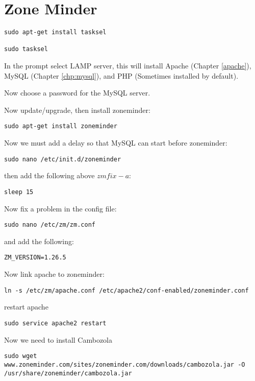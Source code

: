 \chapter{Zone Minder}
\label{chp:zm}

\begin{lstlisting}
sudo apt-get install tasksel

sudo tasksel
\end{lstlisting}

In the prompt select LAMP server, this will install Apache (Chapter \ref{apache}), MySQL (Chapter \ref{chp:mysql}), and PHP (Sometimes installed by default).

Now choose a password for the MySQL server.

Now update/upgrade, then install zoneminder:

\begin{lstlisting}
sudo apt-get install zoneminder
\end{lstlisting}

Now we must add a delay so that MySQL can start before zoneminder:

\begin{lstlisting}
sudo nano /etc/init.d/zoneminder
\end{lstlisting}

then add the following above $zmfix -a$:

\begin{verbatim}
sleep 15
\end{verbatim}

Now fix a problem in the config file:

\begin{lstlisting}
sudo nano /etc/zm/zm.conf
\end{lstlisting}

and add the following:

\begin{verbatim}
ZM_VERSION=1.26.5
\end{verbatim}

Now link apache to zoneminder:

\begin{lstlisting}
ln -s /etc/zm/apache.conf /etc/apache2/conf-enabled/zoneminder.conf
\end{lstlisting}

restart apache

\begin{lstlisting}
sudo service apache2 restart
\end{lstlisting}

Now we need to install Cambozola

\begin{lstlisting}
sudo wget www.zoneminder.com/sites/zoneminder.com/downloads/cambozola.jar -O /usr/share/zoneminder/cambozola.jar
\end{lstlisting}

